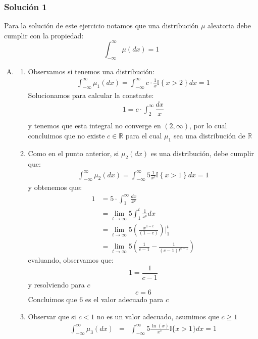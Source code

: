 \documentclass[notitlepage]{article}
\theoremstyle{definition}
\theoremstyle{remark}
\newcommand{\lrp}[1]{\left( #1 \right)}
\newcommand{\set}[1]{\left\lbrace #1 \right\rbrace}
\newcommand{\RR}{\mathbb{R}}
\begin{document}
	\subsubsection*{Solución 1}
	Para la solución de este ejercicio notamos que una distribución $ \mu $ aleatoria debe cumplir con la propiedad:
	\[ \int_{- \infty}^{\infty} \mu(dx) = 1  \]
	\begin{enumerate}[A)]
		\item \begin{enumerate}[1)]
			\item Observamos si tenemos una distribución:
			\begin{align*}
			\int_{-\infty}^{\infty} \mu_1(dx) = \int_{-\infty}^{\infty} c \cdot \frac{1}{x}\mathbb{I} \set{x > 2} dx  = 1 
			\end{align*}
			Solucionamos para calcular la constante:
			\begin{align*}
			1 = c \cdot \int_{2}^{\infty} \dfrac{dx}{x} \\
			\end{align*}
			y tenemos que esta integral no converge en $ (2,\infty) $, por lo cual concluimos que no existe $ c \in \RR $ para el cual $ \mu_1 $ sea una distribución de $ \RR $
			\item		Como en el punto anterior, si $ \mu_2(dx) $ es una distribución, debe cumplir que:
			\begin{align*}
			\int_{-\infty}^{\infty} \mu_2(dx) = \int_{- \infty}^{\infty} 5 \frac{1}{x^c} \mathbb{I}\set{x > 1}dx = 1 
			\end{align*}
			y obtenemos que:
			\begin{align*}
			1 &= 5 \cdot \int_{1}^{\infty}  \frac{dx}{x^c} \\
			&= \lim\limits_{t \rightarrow \infty} 5 \int_{1}^{t} \frac{1}{x^c} dx \\
			&= \lim\limits_{t \rightarrow \infty} 5 \lrp{\frac{x^{1-c}}{(1-c)}} \Big|_1^t \\
			&= \lim\limits_{t \rightarrow \infty} 5 \lrp{\frac{1}{c-1} - \frac{1}{(c-1)t^{c-1}}}
			\end{align*}
			evaluando, observamos que:
			\[ 1 = \frac{1}{c-1} \]
			y resolviendo para $ c $
			\[ c = 6 \]
			Concluimos que $ 6 $ es el valor adecuado para $ c $
			\item Observar que si $ c < 1 $ no es un valor adecuado, asumimos que $ c \geq 1 $
			\begin{eqnarray}
			\int_{-\infty}^{\infty}\mu_3(dx) &=& \int_{-\infty}^{\infty} 5\frac{\ln(x)}{x^c}\mathbb{I}\{x>1\}dx \nonumber = 1

\end{eqnarray}
\end{enumerate}
\end{enumerate}
\end{document}
